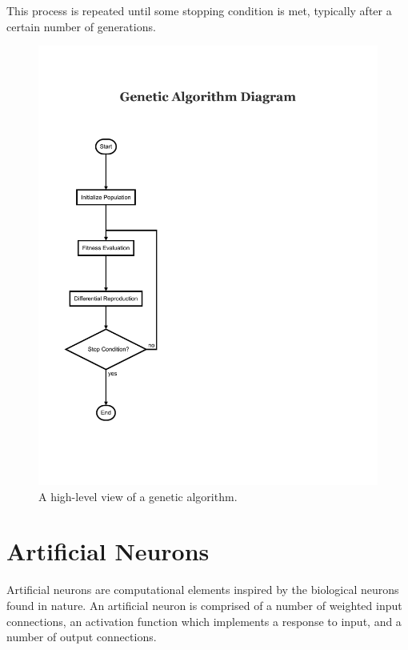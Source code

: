 \documentclass[master]{outhesis}
\begin{document}
This process is repeated until some stopping condition is met, typically after a certain number of generations.

\begin{figure}[H]
	\centering
	\includegraphics{GeneticAlgorithm.pdf}
	\caption{A high-level view of a genetic algorithm.}
\end{figure}

\section{Artificial Neurons}


Artificial neurons are computational elements inspired by the biological neurons found in nature.
An artificial neuron is comprised of a number of weighted input connections, an activation function which implements a response to input, and a number of output connections.
\end{document}
